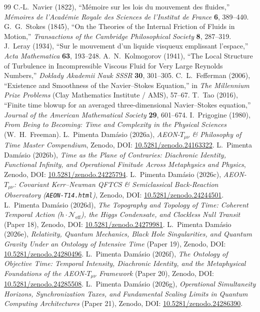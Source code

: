\documentclass[11pt,a4paper]{article}
\begin{document}
\begin{thebibliography}{99}
 C.-L.~Navier (1822), ``M\'emoire sur les lois du mouvement des fluides,'' \emph{M\'emoires de l'Acad\'emie Royale des Sciences de l'Institut de France} \textbf{6}, 389--440.
 G.~G.~Stokes (1845), ``On the Theories of the Internal Friction of Fluids in Motion,'' \emph{Transactions of the Cambridge Philosophical Society} \textbf{8}, 287--319.
 J.~Leray (1934), ``Sur le mouvement d'un liquide visqueux emplissant l'espace,'' \emph{Acta Mathematica} \textbf{63}, 193--248.
 A.~N.~Kolmogorov (1941), ``The Local Structure of Turbulence in Incompressible Viscous Fluid for Very Large Reynolds Numbers,'' \emph{Doklady Akademii Nauk SSSR} \textbf{30}, 301--305.
 C.~L.~Fefferman (2006), ``Existence and Smoothness of the Navier--Stokes Equation,'' in \emph{The Millennium Prize Problems} (Clay Mathematics Institute / AMS), 57--67.
 T.~Tao (2016), ``Finite time blowup for an averaged three-dimensional Navier--Stokes equation,'' \emph{Journal of the American Mathematical Society} \textbf{29}, 601--674.
 I.~Prigogine (1980), \emph{From Being to Becoming: Time and Complexity in the Physical Sciences} (W.~H.~Freeman).
 L.~Pimenta Dam\'asio (2026a), \emph{\textsc{AEON}-$T_{\mu\nu}$ \& Philosophy of Time Master Compendium}, Zenodo, DOI: \href{https://doi.org}{10.5281/zenodo.24163322}.
 L.~Pimenta Dam\'asio (2026b), \emph{Time as the Plane of Contraries: Diachronic Identity, Functional Infinity, and Operational Finitude Across Metaphysics and Physics}, Zenodo, DOI: \href{https://doi.org}{10.5281/zenodo.24225794}.
 L.~Pimenta Dam\'asio (2026c), \emph{\textsc{AEON}-$T_{\mu\nu}$: Covariant Kerr--Newman QFTCS \& Semiclassical Back-Reaction Observatory (\texttt{AEON-T14.html})}, Zenodo, DOI: \href{https://doi.org}{10.5281/zenodo.24244501}.
 L.~Pimenta Dam\'asio (2026d), \emph{The Topography and Topology of Time: Coherent Temporal Action ($h \cdot \mathcal{N}_{\text{eff}}$), the Higgs Condensate, and Clockless Null Transit} (Paper 18), Zenodo, DOI: \href{https://doi.org}{10.5281/zenodo.24279981}.
 L.~Pimenta Dam\'asio (2026e), \emph{Relativity, Quantum Mechanics, Black Hole Singularities, and Quantum Gravity Under an Ontology of Intensive Time} (Paper 19), Zenodo, DOI: \href{https://doi.org}{10.5281/zenodo.24280496}.
 L.~Pimenta Dam\'asio (2026f), \emph{The Ontology of Objective Time: Temporal Intensity, Diachronic Identity, and the Metaphysical Foundations of the \textsc{AEON}-$T_{\mu\nu}$ Framework} (Paper 20), Zenodo, DOI: \href{https://doi.org}{10.5281/zenodo.24285508}.
 L.~Pimenta Dam\'asio (2026g), \emph{Operational Simultaneity Horizons, Synchronization Taxes, and Fundamental Scaling Limits in Quantum Computing Architectures} (Paper 21), Zenodo, DOI: \href{https://doi.org}{10.5281/zenodo.24286390}.
\end{thebibliography}
\end{document}
